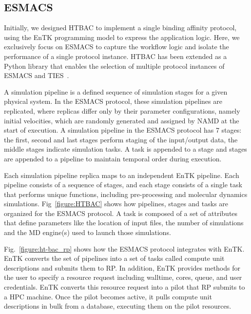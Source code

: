 \subsection{ESMACS}\label{sec:htbac}

Initially, we designed HTBAC to implement a single binding affinity protocol,
using the EnTK programming model to express the application logic. Here, we
exclusively focus on ESMACS to capture the workflow logic and isolate the
performance of a single protocol instance. HTBAC has been extended as a
Python library that enables the selection of multiple protocol instances of
ESMACS and TIES~\cite{dakka}.

A simulation pipeline is a defined sequence of simulation stages for a given
physical system. In the ESMACS protocol, these simulation pipelines are
replicated, where replicas differ only by their parameter configurations,
namely initial velocities, which are randomly generated and assigned by NAMD
at the start of execution. A simulation pipeline in the ESMACS protocol has 7
stages: the first, second and last stages perform staging of the input/output
data, the middle stages indicate simulation tasks. A task is appended to a
stage and stages are appended to a pipeline to maintain temporal order during
execution.


Each simulation pipeline replica maps to an independent EnTK pipeline. Each
pipeline consists of a sequence of stages, and each stage consists of a
single task that performs unique functions, including pre-processing and
molecular dynamics simulations. Fig~\ref{figure:HTBAC} shows how pipelines,
stages and tasks are organized for the ESMACS protocol. A task is composed of
a set of attributes that define parameters like the location of input files,
the number of simulations and the MD engine(s) used to launch those
simulations.


Fig.~\ref{figure:ht-bac_rp} shows how the ESMACS protocol integrates with
EnTK\@. EnTK converts the set of pipelines into a set of tasks called compute
unit descriptions and submits them to RP\@. In addition, EnTK provides
methods for the user to specify a resource request including walltime, cores,
queue, and user credentials. EnTK converts this resource request into a pilot
that RP submits to a HPC machine. Once the pilot becomes active, it pulls
compute unit descriptions in bulk from a database, executing them on the
pilot resources.
